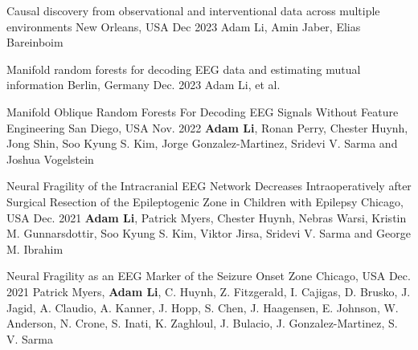 

\begin{cventries}

    {Causal discovery from observational and
interventional data across multiple environments} %
    {New Orleans, USA} %
    {Dec 2023} %
    {Adam Li, Amin Jaber, Elias Bareinboim}%
    {}
    \vspace{-0.4cm}
    
    {Manifold random forests for decoding EEG data and estimating mutual information} %
    {Berlin, Germany} %
    {Dec. 2023} %
    {Adam Li, et al.} %
    {}
    \vspace{-0.4cm}
    
    {Manifold Oblique Random Forests For Decoding EEG Signals Without Feature Engineering}
    {San Diego, USA}
    {Nov. 2022}
    {\textbf{Adam Li}, Ronan Perry, Chester Huynh, Jong Shin, Soo Kyung S. Kim, Jorge Gonzalez-Martinez, Sridevi V. Sarma and Joshua Vogelstein}
    {}
    \vspace{-0.4cm}  

    {Neural Fragility of the Intracranial EEG Network Decreases Intraoperatively after  Surgical Resection of the Epileptogenic Zone in Children with Epilepsy}
    {Chicago, USA}
    {Dec. 2021}
    {\textbf{Adam Li}, Patrick Myers, Chester Huynh, Nebras Warsi, Kristin M. Gunnarsdottir, Soo Kyung S. Kim, Viktor Jirsa, Sridevi V. Sarma and George M. Ibrahim}
    {}
    \vspace{-0.4cm}  
    
    {Neural Fragility as an EEG Marker of the Seizure Onset Zone}
    {Chicago, USA}
    {Dec. 2021}
    {Patrick Myers, \textbf{Adam Li}, C. Huynh, Z. Fitzgerald, I. Cajigas, D. Brusko, J. Jagid, A. Claudio, A. Kanner, J. Hopp, S. Chen, J. Haagensen, E. Johnson, W. Anderson, N. Crone, S. Inati, K. Zaghloul, J. Bulacio, J. Gonzalez-Martinez, S. V. Sarma}
    {}
    \vspace{-0.4cm}  
    

\end{cventries}
